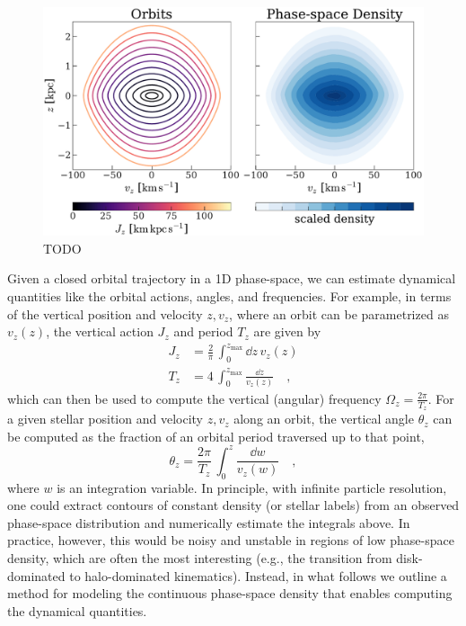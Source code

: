 \begin{figure}[t!]
\begin{center}
\includegraphics[width=\textwidth]{illustrate-zvz.pdf}
\end{center}
\caption{%
TODO
\label{fig:zvz}
}
\end{figure}

Given a closed orbital trajectory in a 1D phase-space, we can estimate dynamical
quantities like the orbital actions, angles, and frequencies.
For example, in terms of the vertical position and velocity $z, v_z$, where an orbit can
be parametrized as $v_z(z)$, the vertical action $J_z$ and period $T_z$ are given by
\begin{align}
    J_z &= \frac{2}{\pi} \, \int_0^{z_{\textrm{max}}} \dd z \, v_z(z) \\
    T_z &= 4 \, \int_0^{z_{\textrm{max}}} \frac{\dd z}{v_z(z)}\quad ,
\end{align}
which can then be used to compute the vertical (angular) frequency $\Omega_z =
\frac{2\pi}{T_z}$.
For a given stellar position and velocity $z, v_z$ along an orbit, the vertical angle
$\theta_z$ can be computed as the fraction of an orbital period traversed up to that
point,
\begin{equation}
    \theta_z = \frac{2\pi}{T_z} \, \int_0^{z} \frac{\dd w}{v_z(w)} \quad ,
\end{equation}
where $w$ is an integration variable.
In principle, with infinite particle resolution, one could extract contours of constant
density (or stellar labels) from an observed phase-space distribution and numerically
estimate the integrals above.
In practice, however, this would be noisy and unstable in regions of low phase-space
density, which are often the most interesting (e.g., the transition from disk-dominated
to halo-dominated kinematics).
Instead, in what follows we outline a method for modeling the continuous phase-space
density that enables computing the dynamical quantities.


